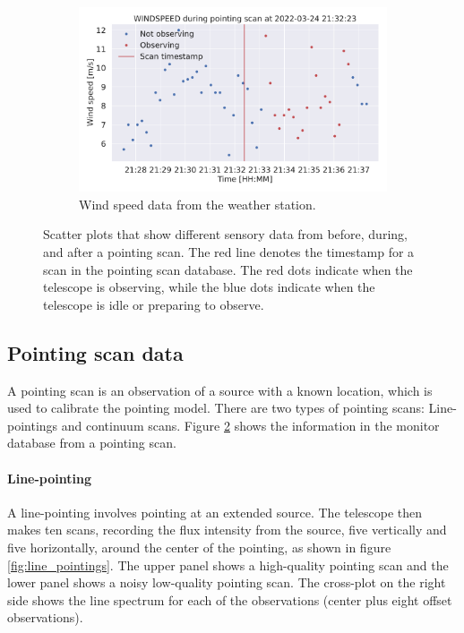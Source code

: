 \begin{figure}[H]
\begin{subfigure}[t]{0.49\textwidth}
        \centering
        \includegraphics[width=\textwidth]{Feature during scans/scan_WINDSPEED_335.pdf}
        \caption{Wind speed data from the weather station.}
        \label{subfig:scan_windspeed}
    \end{subfigure}
     \caption{Scatter plots that show different sensory data from before, during, and after a pointing scan. The red line denotes the timestamp for a scan in the pointing scan database.
     The red dots indicate when the telescope is observing, while the blue dots indicate when the telescope is idle or preparing to observe.}
     \label{fig:features_during_scans}
\end{figure}


\subsection{Pointing scan data}
A pointing scan is an observation of a source with a known location, which is used to calibrate the pointing model.
There are two types of pointing scans: Line-pointings and continuum scans.
Figure \ref{fig:features_during_scans} shows the information in the monitor database from a pointing scan.
\paragraph{Line-pointing}
A line-pointing involves pointing at an extended source. 
The telescope then makes ten scans, recording the flux intensity from the source, five vertically and five horizontally, around the center of the pointing, as shown in figure \ref{fig:line_pointings}.
The upper panel shows a high-quality pointing scan and the lower panel shows a noisy low-quality pointing scan.
The cross-plot on the right side shows the line spectrum for each of the observations (center plus eight offset observations).

